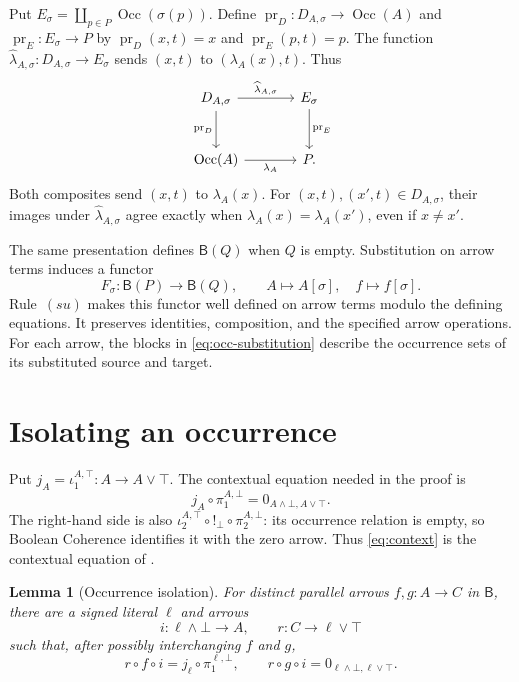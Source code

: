 \documentclass[11pt]{article}
\newtheorem{lemma}[theorem]{Lemma}
\newcommand{\B}{\mathsf B}
\newcommand{\Occ}{\operatorname{Occ}}
\begin{document}
Put $E_\sigma=\coprod_{p\in P}\Occ(\sigma(p))$.
Define $\operatorname{pr}_D:D_{A,\sigma}\to\Occ(A)$ and
$\operatorname{pr}_E:E_\sigma\to P$ by
$\operatorname{pr}_D(x,t)=x$ and $\operatorname{pr}_E(p,t)=p$.
The function
$\widehat\lambda_{A,\sigma}:D_{A,\sigma}\to E_\sigma$ sends
$(x,t)$ to $(\lambda_A(x),t)$. Thus
\begin{equation}
\begin{tikzcd}[column sep=large,row sep=large]
 D_{A,\sigma}\arrow[r,"\widehat\lambda_{A,\sigma}"]
   \arrow[d,"\operatorname{pr}_D"']
   &E_\sigma\arrow[d,"\operatorname{pr}_E"]\\
 \Occ(A)\arrow[r,"\lambda_A"']&P.
\end{tikzcd}
\label{eq:block-square}
\end{equation}
Both composites send $(x,t)$ to $\lambda_A(x)$.
For $(x,t),(x',t)\in D_{A,\sigma}$, their images under
$\widehat\lambda_{A,\sigma}$ agree exactly when
$\lambda_A(x)=\lambda_A(x')$, even if $x\ne x'$.

The same presentation defines $\B(Q)$ when $Q$ is empty.
Substitution on arrow terms induces a functor
\[
 F_\sigma:\B(P)\longrightarrow\B(Q),\qquad
 A\longmapsto A[\sigma],\quad f\longmapsto f[\sigma].
\]
Rule~$(su)$ makes this functor well defined on arrow terms modulo the
defining equations. It preserves identities, composition, and the
specified arrow operations. For each arrow, the blocks in
\eqref{eq:occ-substitution} describe the occurrence sets of its
substituted source and target.

\section{Isolating an occurrence}\label{sec:isolation}

Put $j_A=\iota_1^{A,\top}:A\to A\vee\top$. The contextual equation
needed in the proof is
\begin{equation}
 j_A\circ\pi_1^{A,\bot}
   =0_{A\wedge\bot,A\vee\top}.
 \tag{$K_A$}\label{eq:context}
\end{equation}
The right-hand side is also
$\iota_2^{A,\top}\circ!_\bot\circ\pi_2^{A,\bot}$: its occurrence
relation is empty, so Boolean Coherence identifies it with the zero
arrow. Thus \eqref{eq:context} is the contextual equation of
\cite[\S9.7, pp.~215--216]{DP}.

\begin{lemma}[Occurrence isolation]\label{lem:isolation}
For distinct parallel arrows $f,g:A\to C$ in $\B$, there are a
signed literal $\ell$ and arrows
\[
 i:\ell\wedge\bot\longrightarrow A,
 \qquad r:C\longrightarrow\ell\vee\top
\]
such that, after possibly interchanging $f$ and $g$,
\[
 r\circ f\circ i=j_\ell\circ\pi_1^{\ell,\bot},
 \qquad
 r\circ g\circ i=0_{\ell\wedge\bot,\ell\vee\top}.
\]
\end{lemma}
\end{document}
